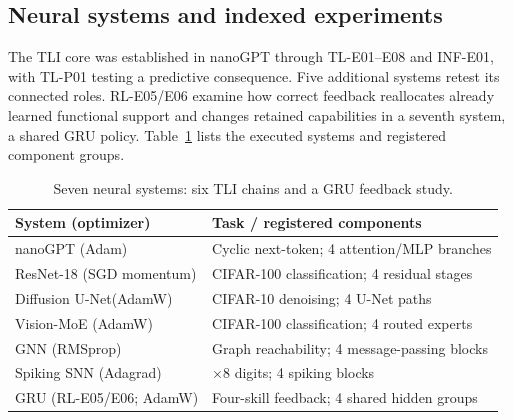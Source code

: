 \documentclass{article}
\begin{document}
\subsection{Neural systems and indexed experiments}
The TLI core was established in nanoGPT through TL-E01--E08 and INF-E01, with TL-P01 testing a predictive consequence. Five additional systems retest its connected roles. RL-E05/E06 examine how correct feedback reallocates already learned functional support and changes retained capabilities in a seventh system, a shared GRU policy. Table~\ref{tab:systems} lists the executed systems and registered component groups.

\begin{table}[t]
\centering\small\setlength{\tabcolsep}{3pt}\renewcommand{\arraystretch}{1.07}
\begin{tabular}{@{}>{\raggedright\arraybackslash}p{}>{\raggedright\arraybackslash}p{}@{}}
\toprule
System (optimizer) & Task / registered components\\
\midrule
nanoGPT (Adam) & Cyclic next-token; 4 attention/MLP branches\\
ResNet-18 (SGD momentum) & CIFAR-100 classification; 4 residual stages\\
Diffusion U-Net\newline(AdamW) & CIFAR-10 denoising; 4 U-Net paths\\
Vision-MoE (AdamW) & CIFAR-100 classification; 4 routed experts\\
GNN (RMSprop) & Graph reachability; 4 message-passing blocks\\
Spiking SNN (Adagrad) & 8$\times$8 digits; 4 spiking blocks\\
GRU (RL-E05/E06; AdamW) & Four-skill feedback; 4 shared hidden groups\\
\bottomrule
\end{tabular}
\caption{Seven neural systems: six TLI chains and a GRU feedback study.}
\label{tab:systems}
\end{table}
\end{document}
